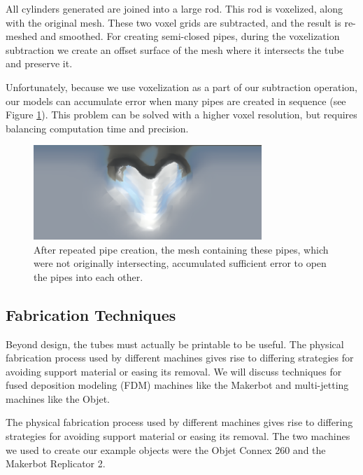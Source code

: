 All cylinders generated are joined into a large rod.  This rod is voxelized, along with the original mesh.  These two voxel grids are subtracted, and the result is re-meshed and smoothed.  For creating semi-closed pipes, during the voxelization subtraction we create an offset surface of the mesh where it intersects the tube and preserve it.

Unfortunately, because we use voxelization as a part of our subtraction operation, our models can accumulate error when many pipes are created in sequence (see Figure \ref{fig:voxelize}).  This problem can be solved with a higher voxel resolution, but requires balancing computation time and precision.

\begin{figure}[h!]
\centering
    \includegraphics[width=3.4in]{figures/voxelize-fail.png}
\caption{After repeated pipe creation, the mesh containing these pipes, which were not originally intersecting, accumulated sufficient error to open the pipes into each other. }
\label{fig:voxelize}
\end{figure}

\subsection{Fabrication Techniques}

Beyond design, the tubes must actually be printable to be useful.  The physical fabrication process used by different machines gives rise to differing strategies for avoiding support material or easing its removal.  We will discuss techniques for fused deposition modeling (FDM) machines like the Makerbot and multi-jetting machines like the Objet.



  
The physical fabrication process used by different machines gives rise to differing strategies for avoiding support material or easing its removal.  The two machines we used to create our example objects were the Objet Connex 260 and the Makerbot Replicator 2.

